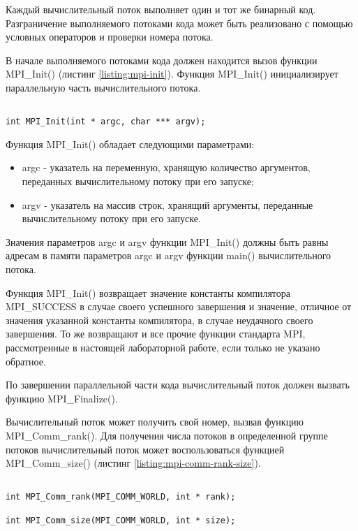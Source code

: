 Каждый вычислительный поток выполняет один и тот же бинарный код. Разграничение выполняемого потоками кода может быть реализовано с помощью условных операторов и проверки номера потока.

В начале выполняемого потоками кода должен находится вызов функции MPI\_Init() (листинг \ref{listing:mpi-init}). Функция MPI\_Init() инициализирует параллельную часть вычислительного потока.

\begin{lstlisting}

int MPI_Init(int * argc, char *** argv);

\end{lstlisting}
\mylistingend

Функция MPI\_Init() обладает следующими параметрами:

\begin{itemize}

	\item argc - указатель на переменную, хранящую количество аргументов, переданных вычислительному потоку при его запуске;
	\item argv - указатель на массив строк, хранящий аргументы, переданные вычислительному потоку при его запуске.

\end{itemize}

Значения параметров argc и argv функции MPI\_Init() должны быть равны адресам в памяти параметров argc и argv функции main() вычислительного потока.

Функция MPI\_Init() возвращает значение константы компилятора MPI\_SUCCESS в случае своего успешного завершения и значение, отличное от значения указанной константы компилятора, в случае неудачного своего завершения. То же возвращают и все прочие функции стандарта MPI, рассмотренные в настоящей лабораторной работе, если только не указано обратное.

По завершении параллельной части кода вычислительный поток должен вызвать функцию MPI\_Finalize().

Вычислительный поток может получить свой номер, вызвав функцию MPI\_Comm\_rank(). Для получения числа потоков в определенной группе потоков вычислительный поток может воспользоваться функцией MPI\_Comm\_size() (листинг \ref{listing:mpi-comm-rank-size}).

\begin{lstlisting}

int MPI_Comm_rank(MPI_COMM_WORLD, int * rank);

int MPI_Comm_size(MPI_COMM_WORLD, int * size);

\end{lstlisting}
\mylistingend

